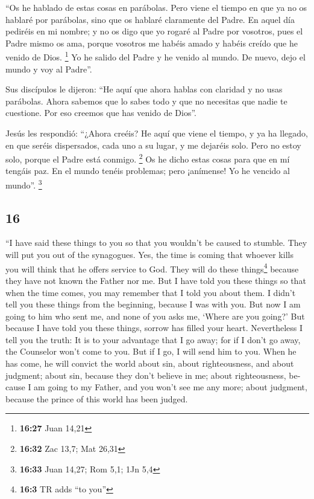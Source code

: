 \begin{paracol}{2}
 ``Os he hablado de estas cosas en parábolas. Pero viene
el tiempo en que ya no os hablaré por parábolas, sino que os hablaré
claramente del Padre.  En aquel día pediréis en mi
nombre; y no os digo que yo rogaré al Padre por vosotros,
 pues el Padre mismo os ama, porque vosotros me habéis
amado y habéis creído que he venido de Dios. \footnote{\textbf{16:27}
  Juan 14,21}  Yo he salido del Padre y he venido al
mundo. De nuevo, dejo el mundo y voy al Padre''.

 Sus discípulos le dijeron: ``He aquí que ahora hablas
con claridad y no usas parábolas.  Ahora sabemos que lo
sabes todo y que no necesitas que nadie te cuestione. Por eso creemos
que has venido de Dios''.

 Jesús les respondió: ``¿Ahora creéis?  He
aquí que viene el tiempo, y ya ha llegado, en que seréis dispersados,
cada uno a su lugar, y me dejaréis solo. Pero no estoy solo, porque el
Padre está conmigo. \footnote{\textbf{16:32} Zac 13,7; Mat 26,31}
 Os he dicho estas cosas para que en mí tengáis paz. En
el mundo tenéis problemas; pero ¡anímense! Yo he vencido al mundo''.
\footnote{\textbf{16:33} Juan 14,27; Rom 5,1; 1Jn 5,4}

\switchcolumn
\begin{otherlanguage}{english}

\hypertarget{section-31}{%
\section{16}\label{section-31}}

 ``I have said these things to you so that you wouldn't be
caused to stumble.  They will put you out of the
synagogues. Yes, the time is coming that whoever kills you will think
that he offers service to God.  They will do these
things\footnote{\textbf{16:3} TR adds ``to you''} because they have not
known the Father nor me.  But I have told you these things
so that when the time comes, you may remember that I told you about
them. I didn't tell you these things from the beginning, because I was
with you.  But now I am going to him who sent me, and none
of you asks me, `Where are you going?'  But because I have
told you these things, sorrow has filled your heart. 
Nevertheless I tell you the truth: It is to your advantage that I go
away; for if I don't go away, the Counselor won't come to you. But if I
go, I will send him to you.  When he has come, he will
convict the world about sin, about righteousness, and about judgment;
 about sin, because they don't believe in me;
 about righteousness, because I am going to my Father,
and you won't see me any more;  about judgment, because
the prince of this world has been judged.


\end{otherlanguage}
\end{paracol}
